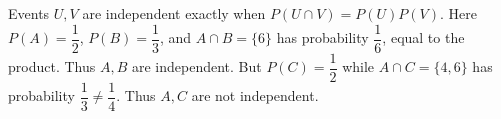 Events $ U,V $ are independent exactly when $ P(U\cap V)=P(U)P(V)$. Here $ P(A)=\dfrac{1}{2}$, $ P(B)=\dfrac{1}{3}$, and $ A\cap B=\{6\}$ has probability $\dfrac{1}{6}$, equal to the product. Thus $ A,B $ are independent. But $ P(C)=\dfrac{1}{2}$ while $ A\cap C=\{4,6\}$ has probability $\dfrac{1}{3}\ne\dfrac{1}{4}$. Thus $ A,C $ are not independent.
